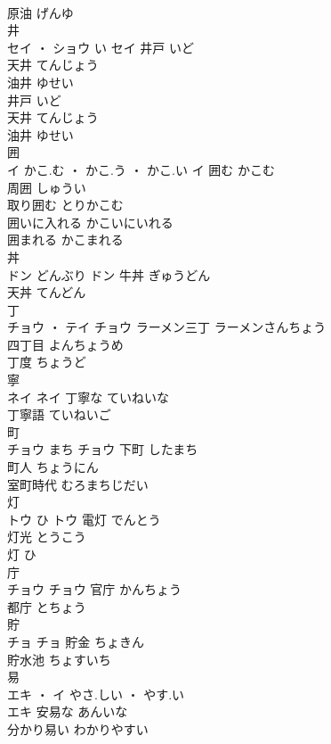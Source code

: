 \documentclass[8pt]{extreport}
\begin{document}
\begin{CJK}{UTF8}{min}
\\	原油	げんゆ	
\\	井	
\\	セイ ・ ショウ	い	セイ	井戸	いど	
\\	天井	てんじょう	
\\	油井	ゆせい	
\\	井戸	いど	
\\	天井	てんじょう	
\\	油井	ゆせい	
\\	囲	
\\	イ	かこ.む ・ かこ.う ・ かこ.い	イ	囲む	かこむ	
\\	周囲	しゅうい	
\\	取り囲む	とりかこむ	
\\	囲いに入れる	かこいにいれる	
\\	囲まれる	かこまれる	
\\	丼	
\\	ドン	どんぶり	ドン													牛丼	ぎゅうどん	
\\	天丼	てんどん	
\\	丁	
\\	チョウ ・ テイ		チョウ													ラーメン三丁	ラーメンさんちょう	
\\	四丁目	よんちょうめ	
\\	丁度	ちょうど	
\\	寧	
\\	ネイ		ネイ	丁寧な	ていねいな	
\\	丁寧語	ていねいご	
\\	町	
\\	チョウ	まち	チョウ	下町	したまち	
\\	町人	ちょうにん	
\\	室町時代	むろまちじだい	
\\	灯	
\\	トウ	ひ	トウ	電灯	でんとう	
\\	灯光	とうこう	
\\	灯	ひ	
\\	庁	
\\	チョウ		チョウ	官庁	かんちょう	
\\	都庁	とちょう	
\\	貯	
\\	チョ		チョ	貯金	ちょきん	
\\	貯水池	ちょすいち	
\\	易	
\\	エキ ・ イ	やさ.しい ・ やす.い
\\	エキ	安易な	あんいな	
\\	分かり易い	わかりやすい	

\end{CJK}
\end{document}

